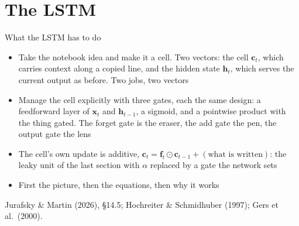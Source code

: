 \documentclass[aspectratio=169, 11pt]{beamer}
\newcommand{\srcline}[1]{%
  \par\vspace{0.25em}%
  {\scriptsize\color{mcMuted}\hfill #1\par}}
\newcommand{\src}[3]{}      %
\begin{document}
\section{The LSTM}

\begin{frame}{What the LSTM has to do}
  \src{jurafsky_slp3}{section}{14.5}
  \src{hochreiter1997}{section}{4.1}
  \vspace{0.05em}
  {\footnotesize
  \begin{itemize}\itemsep0.30em
    \item Take the notebook idea and make it a cell. Two vectors: the
          \alert{cell} $\mathbf{c}_t$, which carries context along a copied
          line, and the \alert{hidden state} $\mathbf{h}_t$, which serves the
          current output as before. Two jobs, two vectors
    \item Manage the cell explicitly with three gates, each the same
          design: a feedforward layer of $\mathbf{x}_t$ and $\mathbf{h}_{t-1}$, a
          sigmoid, and a pointwise product with the thing gated. The
          \alert{forget gate} is the eraser, the \alert{add gate} the pen,
          the \alert{output gate} the lens
    \item The cell's own update is additive,
          $\mathbf{c}_t = \mathbf{f}_t \odot \mathbf{c}_{t-1} + (\text{what is written})$:
          the leaky unit of the last section with $\alpha$ replaced by a
          gate the network sets
    \item First the picture, then the equations, then why it works
  \end{itemize}}
  \srcline{Jurafsky \& Martin (2026), \S14.5; Hochreiter \& Schmidhuber (1997); Gers et al.\ (2000).}
\end{frame}
\end{document}
